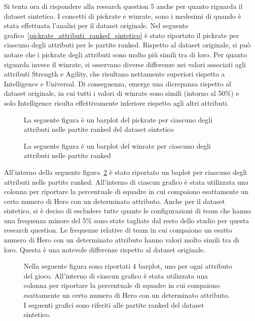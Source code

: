 Si tenta ora di rispondere alla research question 5 anche per quanto riguarda il dataset sintetico. I concetti di pickrate e winrate, sono i medesimi di quando è stata effettuata l'analisi per il dataset originale. Nel seguente grafico~\ref{pickrate_attributi_ranked_sintetico} è stato riportato il pickrate per ciascuno degli attributi per le partite ranked. Rispetto al dataset originale, si può notare che i pickrate degli attributi sono molto più simili tra di loro. Per quanto riguarda invece il winrate, si osservano diverse differenze nei valori associati agli attributi Strength e Agility, che risultano nettamente superiori rispetto a Intelligence e Universal. Di conseguenza, emerge una dicrepanza rispetto al dataset originale, in cui tutti i valori di winrate sono simili (intorno al 50\%) e solo Intelligence risulta effettivamente inferiore rispetto agli altri attributi.
\begin{figure}[htbp]
\centering
\begin{multicols}{2}
\hspace*{-0.2\linewidth}

\caption{La seguente figura è un barplot del pickrate per ciascuno degli attributi nelle partite ranked del dataset sintetico}
\label{pickrate_attributi_ranked_sintetico}
\hspace*{-0.1\linewidth}

\caption{ La seguente figura è un barplot del winrate per ciascuno degli attributi nelle partite ranked }
\label{winrate_attributi_ranked_sintetico}
\end{multicols}
\end{figure} 
All'interno della seguente figura~\ref{pickrate_attributi_merged_sintetico} è stato riportato un baplot per ciascuno degli attributi nelle partite ranked. All'interno di ciascun grafico è stata utilizzata una colonna per riportare la percentuale di squadre in cui compaiono esattamente un certo numero di Hero con un determinato attributo. Anche per il dataset sintetico, si è deciso di escludere tutte quante le configurazioni di team che hanno una frequenza minore del 5\% sono state tagliate dal resto dello studio per questa research question. Le frequenze relative di team in cui compaiono un esatto numero di Hero con un determinato attributo hanno valori molto simili tra di loro. Questa è una notevole differenze rispetto al dataset originale.
\begin{figure}[htbp]
\begin{center}

\caption{Nella seguente figura sono riportati 4 barplot, uno per ogni attributo del gioco. All'interno di ciascun grafico è stata utilizzata una colonna per riportare la percentuale di squadre in cui compaiono esattamente un certo numero di Hero con un determinato attributo. I seguenti grafici sono riferiti alle partite ranked del dataset sintetico. }
\label{pickrate_attributi_merged_sintetico}
\end{center}
\end{figure}
